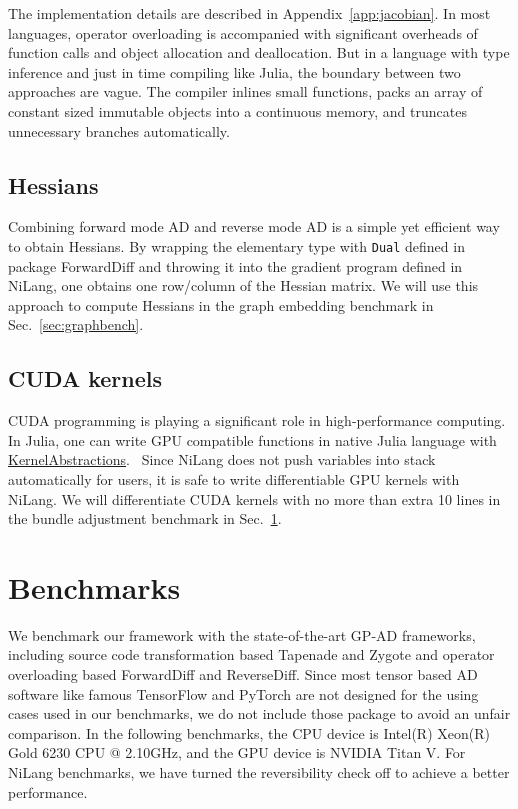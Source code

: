 \documentclass{article}
\newcommand{\<}{\langle}
\renewcommand{\>}{\rangle}
\renewcommand{\cite}[1]{{\citep{#1}}}
\newcommand{\Sec}[1]{Sec.~\ref{#1}}
\newcommand{\App}[1]{Appendix~\ref{#1}}
\theoremstyle{definition}\newtheorem{definition}{\textit{Definition}}
\begin{document}
The implementation details are described in \App{app:jacobian}.
In most languages, operator overloading is accompanied with significant overheads of function calls and object allocation and deallocation.
But in a language with type inference and just in time compiling like Julia, the boundary between two approaches are vague.
The compiler inlines small functions, packs an array of constant sized immutable objects into a continuous memory, and truncates unnecessary branches automatically.

\subsection{Hessians}
Combining forward mode AD and reverse mode AD is a simple yet efficient way to obtain Hessians.
By wrapping the elementary type with \texttt{Dual} defined in package ForwardDiff and throwing it into the gradient program defined in NiLang, one obtains one row/column of the Hessian matrix.
We will use this approach to compute Hessians in the graph embedding benchmark in \Sec{sec:graphbench}.

\subsection{CUDA kernels}
CUDA programming is playing a significant role in high-performance computing. In Julia, one can write GPU compatible functions in native Julia language with \href{https://github.com/JuliaGPU/KernelAbstractions.jl}{KernelAbstractions}.~\cite{Besard2018}
Since NiLang does not push variables into stack automatically for users, it is safe to write differentiable GPU kernels with NiLang.
We will differentiate CUDA kernels with no more than extra 10 lines in the bundle adjustment benchmark in \Sec{sec:benchmark}.

\section{Benchmarks}\label{sec:benchmark}

We benchmark our framework with the state-of-the-art GP-AD frameworks, including source code transformation based Tapenade and Zygote and operator overloading based ForwardDiff and ReverseDiff. 
Since most tensor based AD software like famous TensorFlow and PyTorch are not designed for the using cases used in our benchmarks, we do not include those package to avoid an unfair comparison.
In the following benchmarks, the CPU device is Intel(R) Xeon(R) Gold 6230 CPU @ 2.10GHz, and the GPU device is NVIDIA Titan V.
For NiLang benchmarks, we have turned the reversibility check off to achieve a better performance.
\end{document}
